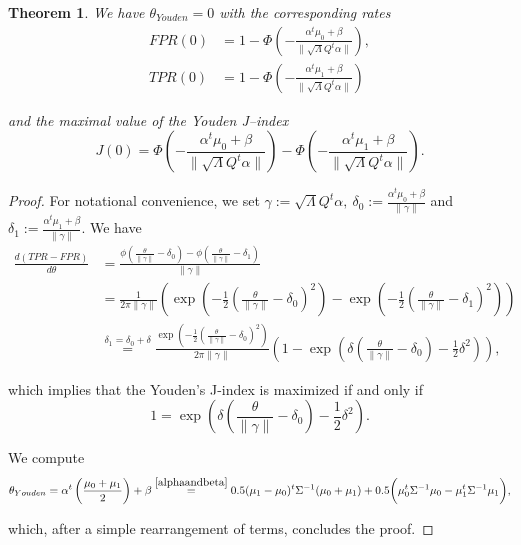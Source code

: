 \documentclass[10pt]{article}
\newtheorem{thm}{Theorem}
\begin{document}
\begin{thm}
We have $\theta_{Youden} = 0$ with the corresponding rates 
\begin{equation*}
\begin{split}
FPR(0) &= 1 - \Phi\left(-\frac{\alpha^t\mu_0 + \beta}{\|\sqrt{\Lambda}Q^t\alpha\|}\right),\\
TPR(0) &= 1-\Phi\left(-\frac{\alpha^t\mu_1 + \beta}{\|\sqrt{\Lambda}Q^t\alpha\|}\right)
\end{split}
\end{equation*}

\noindent
and the maximal value of the Youden J--index
$$J(0) = \Phi\left(-\frac{\alpha^t\mu_0 + \beta}{\|\sqrt{\Lambda}Q^t\alpha\|}\right) - \Phi\left(-\frac{\alpha^t\mu_1 + \beta}{\|\sqrt{\Lambda}Q^t\alpha\|}\right).$$
\end{thm}
\begin{proof}
For notational convenience, we set $\gamma := \sqrt{\Lambda}Q^t\alpha,\ \delta_0 := \frac{\alpha^t\mu_0 + \beta}{\|\gamma\|}$ and $\delta_1 := \frac{\alpha^t\mu_1 + \beta}{\|\gamma\|}.$ We have 
\begin{equation*}
\begin{split}
\frac{d(TPR-FPR)}{d\theta} &= \frac{\phi\left(\frac{\theta}{\|\gamma\|} - \delta_0\right) - \phi\left(\frac{\theta}{\|\gamma\|} - \delta_1\right)}{\|\gamma\|}\\
&= \frac{1}{2\pi\|\gamma\|} \left(\exp\left(-\frac{1}{2}\left(\frac{\theta}{\|\gamma\|} - \delta_0\right)^2\right) - \exp\left(-\frac{1}{2}\left(\frac{\theta}{\|\gamma\|} - \delta_1\right)^2\right)\right) \\
&\stackrel{\delta_1 = \delta_0 + \delta}{=} \frac{\exp\left(-\frac{1}{2}\left(\frac{\theta}{\|\gamma\|} - \delta_0\right)^2\right)}{2\pi\|\gamma\|} \left(1 - \exp\left(\delta\left(\frac{\theta}{\|\gamma\|}-\delta_0\right) - \frac{1}{2}\delta^2\right)\right),
\end{split}
\end{equation*} 

\noindent
which implies that the Youden's J-index is maximized if and only if  
$$1 = \exp\left(\delta\left(\frac{\theta}{\|\gamma\|}-\delta_0\right) - \frac{1}{2}\delta^2\right).$$

\noindent
We compute 
$$\theta_{Youden} = \alpha^t\left(\frac{\mu_0+\mu_1}{2}\right) + \beta \stackrel{\eqref{alphaandbeta}}{=} 0.5(\mu_1 - \mu_0)^t\Sigma^{-1}(\mu_0+\mu_1) + 0.5\bigg(\mu_0^t\Sigma^{-1}\mu_0 - \mu_1^t\Sigma^{-1}\mu_1\bigg),$$

\noindent
which, after a simple rearrangement of terms, concludes the proof. 
\end{proof}
\end{document}
